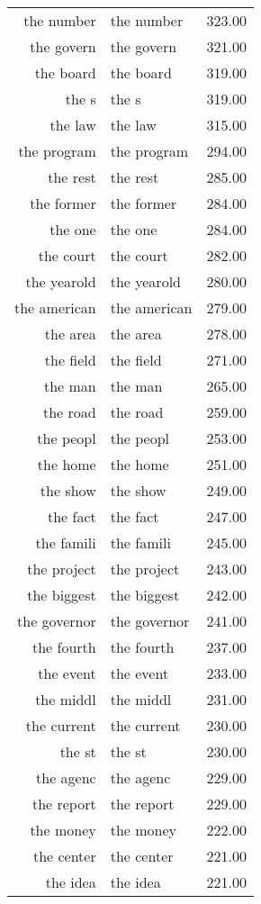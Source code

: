 \begin{table}[ht]
\begin{tabular}{rlr}
  the number & the number & 323.00 \\ 
  the govern & the govern & 321.00 \\ 
  the board & the board & 319.00 \\ 
  the s & the s & 319.00 \\ 
  the law & the law & 315.00 \\ 
  the program & the program & 294.00 \\ 
  the rest & the rest & 285.00 \\ 
  the former & the former & 284.00 \\ 
  the one & the one & 284.00 \\ 
  the court & the court & 282.00 \\ 
  the yearold & the yearold & 280.00 \\ 
  the american & the american & 279.00 \\ 
  the area & the area & 278.00 \\ 
  the field & the field & 271.00 \\ 
  the man & the man & 265.00 \\ 
  the road & the road & 259.00 \\ 
  the peopl & the peopl & 253.00 \\ 
  the home & the home & 251.00 \\ 
  the show & the show & 249.00 \\ 
  the fact & the fact & 247.00 \\ 
  the famili & the famili & 245.00 \\ 
  the project & the project & 243.00 \\ 
  the biggest & the biggest & 242.00 \\ 
  the governor & the governor & 241.00 \\ 
  the fourth & the fourth & 237.00 \\ 
  the event & the event & 233.00 \\ 
  the middl & the middl & 231.00 \\ 
  the current & the current & 230.00 \\ 
  the st & the st & 230.00 \\ 
  the agenc & the agenc & 229.00 \\ 
  the report & the report & 229.00 \\ 
  the money & the money & 222.00 \\ 
  the center & the center & 221.00 \\ 
  the idea & the idea & 221.00 \\ 

\end{tabular}
\end{table}
